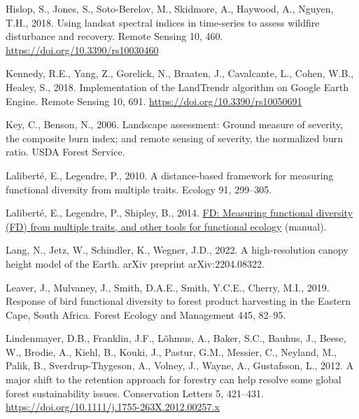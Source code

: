 \documentclass[
  12pt,
]{article}
\newlength{\cslhangindent}
\newlength{\cslentryspacingunit} %
\newenvironment{CSLReferences}[2] %
 {%
  \setlength{\parindent}{0pt}
  \ifodd #1
  \let\oldpar\par
  \def\par{\hangindent=\cslhangindent\oldpar}
  \fi
  \setlength{\parskip}{#2\cslentryspacingunit}
 }%
 {}
\begin{document}
\begin{CSLReferences}{1}{0}
\leavevmode{}%
Hislop, S., Jones, S., Soto-Berelov, M., Skidmore, A., Haywood, A., Nguyen, T.H., 2018. Using landsat spectral indices in time-series to assess wildfire disturbance and recovery. Remote Sensing 10, 460. \url{https://doi.org/10.3390/rs10030460}

\leavevmode{}%
Kennedy, R.E., Yang, Z., Gorelick, N., Braaten, J., Cavalcante, L., Cohen, W.B., Healey, S., 2018. Implementation of the {LandTrendr} algorithm on {Google} {Earth} {Engine}. Remote Sensing 10, 691. \url{https://doi.org/10.3390/rs10050691}

\leavevmode{}%
Key, C., Benson, N., 2006. Landscape assessment: Ground measure of severity, the composite burn index; and remote sensing of severity, the normalized burn ratio. USDA Forest Service.

\leavevmode{}%
Laliberté, E., Legendre, P., 2010. A distance‐based framework for measuring functional diversity from multiple traits. Ecology 91, 299--305.

\leavevmode{}%
Laliberté, E., Legendre, P., Shipley, B., 2014. \href{https://CRAN.R-project.org/package=FD}{{FD}: {Measuring} functional diversity ({FD}) from multiple traits, and other tools for functional ecology} (manual).

\leavevmode{}%
Lang, N., Jetz, W., Schindler, K., Wegner, J.D., 2022. A high-resolution canopy height model of the {Earth}. arXiv preprint arXiv:2204.08322.

\leavevmode{}%
Leaver, J., Mulvaney, J., Smith, D.A.E., Smith, Y.C.E., Cherry, M.I., 2019. Response of bird functional diversity to forest product harvesting in the {Eastern} {Cape}, {South} {Africa}. Forest Ecology and Management 445, 82--95.

\leavevmode{}%
Lindenmayer, D.B., Franklin, J.F., Lõhmus, A., Baker, S.C., Bauhus, J., Beese, W., Brodie, A., Kiehl, B., Kouki, J., Pastur, G.M., Messier, C., Neyland, M., Palik, B., Sverdrup-Thygeson, A., Volney, J., Wayne, A., Gustafsson, L., 2012. A major shift to the retention approach for forestry can help resolve some global forest sustainability issues. Conservation Letters 5, 421--431. \url{https://doi.org/10.1111/j.1755-263X.2012.00257.x}


\end{CSLReferences}
\end{document}

